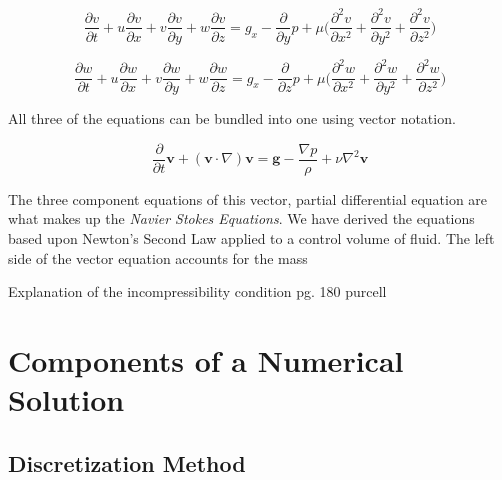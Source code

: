 \documentclass[twocolumn,12pth]{article}
\begin{document}
\begin{equation*}
\frac{\partial{v}}{\partial{t}} + u\frac{\partial{v}}{\partial{x}} + v\frac{\partial{v}}{\partial{y}} + w\frac{\partial{v}}{\partial{z}} = g_x -\frac{\partial}{\partial{y}}p + \mu \bigg( \frac{\partial^2v}{\partial{x}^2} + \frac{\partial^2v}{\partial{y}^2} + \frac{\partial^2v}{\partial{z}^2} \bigg)
\end{equation*}

\begin{equation*}
\frac{\partial{w}}{\partial{t}} + u\frac{\partial{w}}{\partial{x}} + v\frac{\partial{w}}{\partial{y}} + w\frac{\partial{w}}{\partial{z}} = g_x -\frac{\partial}{\partial{z}}p + \mu \bigg( \frac{\partial^2w}{\partial{x}^2} + \frac{\partial^2w}{\partial{y}^2} + \frac{\partial^2w}{\partial{z}^2} \bigg)
\end{equation*}

All three of the equations can be bundled into one using vector notation.

\begin{equation}
\frac{\partial}{\partial{t}} \mathbf{v} + (\mathbf{v} \cdot \nabla)\mathbf{v} = \mathbf{g} - \frac{\nabla{p}}{\rho} + \nu\nabla^2{\mathbf{v}}
\end{equation}

The three component equations of this vector, partial differential equation are what makes up the \textit{Navier Stokes Equations}.
We have derived the equations based upon Newton's Second Law applied to a control volume of fluid.
The left side of the vector equation accounts for the mass 

Explanation of the incompressibility condition pg. 180 purcell

\section{Components of a Numerical Solution}

\subsection{Discretization Method}
\end{document}
